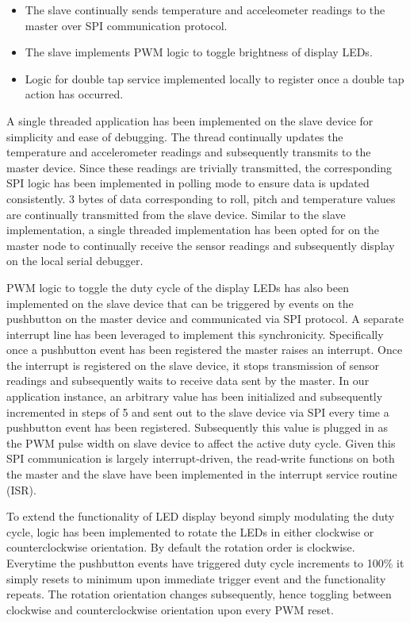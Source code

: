 \begin{itemize}
\item The slave continually sends temperature and acceleometer readings to the master over SPI communication protocol.
\item The slave implements PWM logic to toggle brightness of display LEDs. %
\item Logic for double tap service implemented locally to register once a double tap action has occurred. 
\end{itemize}

A single threaded application has been implemented on the slave device for simplicity and ease of debugging. The thread continually updates the temperature and accelerometer readings and subsequently transmits to the master device. Since these readings are trivially transmitted, the corresponding SPI logic has been implemented in polling mode to ensure data is updated consistently. 3 bytes of data corresponding to roll, pitch and temperature values are continually transmitted from the slave device. Similar to the slave implementation, a single threaded implementation has been opted for on the master node to continually receive the sensor readings and subsequently display on the local serial debugger. 

PWM logic to toggle the duty cycle of the display LEDs has also been implemented on the slave device that can be triggered by events on the pushbutton on the master device and communicated via SPI protocol. A separate interrupt line has been leveraged to implement this synchronicity. Specifically once a pushbutton event has been registered the master raises an interrupt. Once the interrupt is registered on the slave device, it stops transmission of sensor readings and subsequently waits to receive data sent by the master. In our application instance, an arbitrary value has been initialized and subsequently incremented in steps of 5 and sent out to the slave device via SPI every time a pushbutton event has been registered. Subsequently this value is plugged in as the PWM pulse width on slave device to affect the active duty cycle. Given this SPI communication is largely interrupt-driven, the read-write functions on both the master and the slave have been implemented in the interrupt service routine (ISR). 

To extend the functionality of LED display beyond simply modulating the duty cycle, logic has been implemented to rotate the LEDs in either clockwise or counterclockwise orientation. By default the rotation order is clockwise. Everytime the pushbutton events have triggered duty cycle increments to 100\% it simply resets to minimum upon immediate trigger event and the functionality repeats. The rotation orientation changes subsequently, hence toggling between clockwise and counterclockwise orientation upon every PWM reset. 

